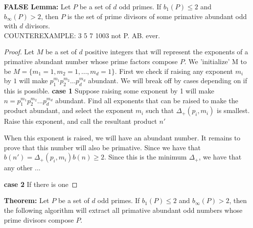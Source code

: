 \documentclass[../paper.tex]{subfiles}
\begin{document}
\textbf{FALSE Lemma:} Let $P$ be a set of $d$ odd primes. If $b_{1}(P) \leq 2$
and $b_{\infty}(P) > 2$, then $P$ is the set of prime divisors of 
some primative abundant odd with $d$ divisors.\\ COUNTEREXAMPLE:
3 5 7 1003 not P. AB. ever.

\begin{proof}

Let $M$ be a set of $d$ positive integers that will represent
the exponents of a primative abundant number whose prime factors
compose $P$. We 'initialize' M to be
%
$M = \{m_1=1, m_2=1, ..., m_d=1 \}$. 
%
First we check if raising any exponent $m_i$ by $1$ will make 
$p_1^{m_1} p_2^{m_2} ... p_d^{m_d}$ abundant. We will break off
by cases depending on if this is possible.
\textbf{case 1}
	Suppose raising some exponent by 1 will make $n = p_1^{m_1} 
p_2^{m_2} ... p_d^{m_d}$ abundant. Find all exponents that can be
raised to make the product abundant, and select the exponent $m_i$
such that $\Delta_{+}(p_i, m_i)$ is smallest. Raise this exponent,
and call the resultant product $n'$

When this exponent is raised, we will have an abundant number. It
remains to prove that this number will also be primative. Since
we have that $b(n') = \Delta_{+}(p_i, m_i) b(n) \geq 2$. Since 
this is the minimum $\Delta_{+}$, we have that any other ...

\textbf{case 2}
If there is one 
%


\end{proof}


\textbf{Theorem:} Let $P$ be a set of $d$ odd primes. If $b_{1}(P) \leq 2$
and $b_{\infty}(P) > 2$, then the following algorithm will extract all primative
abundant odd numbers whose prime divisors compose $P$.

%
%
%
%
%
\end{document}

